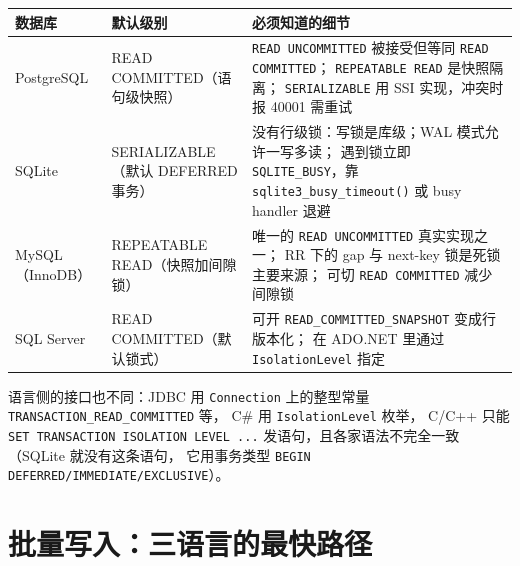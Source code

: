 \documentclass[12pt,a4paper,fontset=fandol]{ctexbook}
\newcommand{\Fn}[1]{\texttt{#1()}}
\newcommand{\Tp}[1]{\texttt{#1}}
\newcommand{\CSharp}{C\#}
\newcommand{\CppJava}{C/C++}
\begin{document}
\begin{footnotesize}
\begin{longtable}{@{}>{\raggedright\arraybackslash}p{}
                  >{\raggedright\arraybackslash}p{}
                  >{\raggedright\arraybackslash}p{}@{}}
\toprule
\textbf{数据库} & \textbf{默认级别} & \textbf{必须知道的细节} \\
\midrule
PostgreSQL & READ COMMITTED（语句级快照） &
\texttt{READ UNCOMMITTED} 被接受但等同 \texttt{READ COMMITTED}；
\texttt{REPEATABLE READ} 是快照隔离；
\texttt{SERIALIZABLE} 用 SSI 实现，冲突时报 40001 需重试 \\
\addlinespace
SQLite & SERIALIZABLE（默认 DEFERRED 事务） &
没有行级锁：写锁是库级；WAL 模式允许一写多读；
遇到锁立即 \Tp{SQLITE\_BUSY}，靠 \Fn{sqlite3\_busy\_timeout}
或 busy handler 退避 \\
\addlinespace
MySQL（InnoDB） & REPEATABLE READ（快照加间隙锁） &
唯一的 \texttt{READ UNCOMMITTED} 真实实现之一；
RR 下的 gap 与 next-key 锁是死锁主要来源；
可切 \texttt{READ COMMITTED} 减少间隙锁 \\
\addlinespace
SQL Server & READ COMMITTED（默认锁式） &
可开 \texttt{READ\_COMMITTED\_SNAPSHOT} 变成行版本化；
在 ADO.NET 里通过 \Tp{IsolationLevel} 指定 \\
\bottomrule
\end{longtable}
\end{footnotesize}

语言侧的接口也不同：JDBC 用 \Tp{Connection} 上的整型常量
\Tp{TRANSACTION\_READ\_\allowbreak COMMITTED} 等，
\CSharp{} 用 \Tp{IsolationLevel} 枚举，
\CppJava{} 只能 \texttt{SET TRANSACTION \allowbreak ISOLATION LEVEL ...}
发语句，且各家语法不完全一致（SQLite 就没有这条语句，
它用事务类型 \texttt{BEGIN DEFERRED/\allowbreak{}\allowbreak IMMEDIATE/EXCLUSIVE}）。

\section{批量写入：三语言的最快路径}
\end{document}
